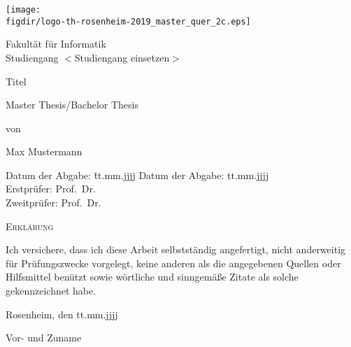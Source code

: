 \begin{titlepage}

\sffamily

\raggedleft

\vspace*{-2cm}

\texttt{[image: \\figdir/logo-th-rosenheim-2019\_master\_quer\_2c.eps]}

\vfill

\centering
\LARGE
Fakultät für Informatik  \vspace{0.5cm}\\
\Large
Studiengang $<$Studiengang einsetzen$>$

\vspace{2cm}

\LARGE

Titel

\vspace{2cm}

\Large
Master Thesis/Bachelor Thesis

\vspace{1.5cm}


\Large
von

\vspace{0.5cm}


\LARGE
Max Mustermann \vspace{1cm}

\vspace{1cm}

\flushleft
 \Large
\vspace*{\fill}

\begin{tabbing}
Datum der Abgabe: \= tt.mm.jjjj \kill
Datum der Abgabe: \> tt.mm.jjjj \\
Erstprüfer: \> Prof.\ Dr.\ \\
Zweitprüfer: \> Prof.\ Dr.\
\end{tabbing}

\end{titlepage}

\cleardoubleemptypage

{
\large
\thispagestyle{empty}
\vspace*{\fill}

\noindent
\textsc{Erklärung}

\medskip

\noindent
Ich versichere, dass ich diese Arbeit selbstständig
angefertigt, nicht anderweitig für Prüfungszwecke
vorgelegt, keine anderen als die angegebenen Quellen
oder Hilfsmittel benützt sowie wörtliche und
sinngemäße Zitate als solche gekennzeichnet habe.

\bigskip

\noindent
Rosenheim, den tt.mm.jjjj

\vspace*{2cm}

\noindent
Vor- und Zuname
}

